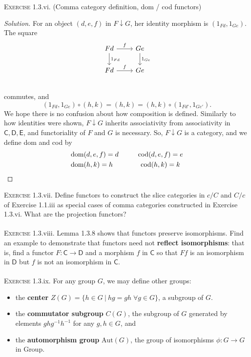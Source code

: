 \documentclass{article}
\newcommand{\cat}[1]{\textsf{#1}}
\newenvironment{solution}{\begin{proof}[Solution]}{\end{proof}}
\begin{document}
\textsc{Exercise} 1.3.vi. (Comma category definition, dom / cod functors)
\begin{solution}
    For an object $(d, e, f)$ in $F \downarrow G$, her identity morphism is $(1_{Fd}, 1_{Ge})$. The square 
    \[
    \begin{tikzcd}
        Fd \arrow[d, "1_{Fd}"] \arrow[r, "f"] &Ge \arrow[d, "1_{Ge}"] \\
        Fd \arrow[r, "f"] &Ge \\
    \end{tikzcd}
    \]
    commutes, and 
    \[
    (1_{Fd}, 1_{Ge}) \circ (h, k) = (h, k) = (h, k) \circ (1_{Fd'}, 1_{Ge'}).
    \]
    We hope there is no confusion about how composition is defined. Similarly to how identities were shown, $F \downarrow G$ inherits associativity from associativity in $\cat{C}, \cat{D}, \cat{E}$, and functoriality of $F$ and $G$ is necessary. So, $F \downarrow G$ is a category, and we define dom and cod by
    \begin{align*}
    &\text{dom}(d, e, f) = d \hspace{1cm} \text{cod}(d, e, f) = e\\ 
    &\text{dom}(h, k) = h  \hspace{1.433cm} \text{cod}(h,k) = k
    \end{align*}
    
        

\end{solution}    
\textsc{Exercise} 1.3.vii. Define functors to construct the slice categories in $c/C$ and $C/c$ of Exercise 1.1.iii as special cases of comma categories constructed in Exercise 1.3.vi. What are the projection functors? \\ \\
\textsc{Exercise} 1.3.viii. Lemma 1.3.8 shows that functors preserve isomorphisms. Find an example to demonstrate that functors need not \textbf{reflect isomorphisms}: that is, find a functor $F: \textsf{C} \to \textsf{D}$ and a morphism $f$ in $\textsf{C}$ so that $Ff$ is an isomorphism in $\textsf{D}$ but $f$ is not an isomorphism in $\textsf{C}$. \\ \\
\textsc{Exercise} 1.3.ix. For any group $G$, we may define other groups:
\begin{itemize}
    \item the \textbf{center} $Z(G) = \{ h \in G \: | \: hg=gh \; \forall g \in G \}$, a subgroup of $G$. 
    \item the \textbf{commutator subgroup} $C(G)$, the subgroup of $G$ generated by elements $ghg^{-1}h^{-1}$ for any $g,h \in G$, and
    \item the \textbf{automorphism group} $\text{Aut}(G)$, the group of isomorphisms $\phi: G \to G$ in \cat{Group}.
\end{itemize}
\end{document}
